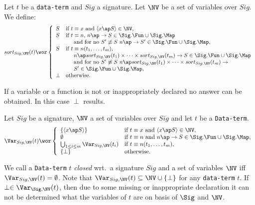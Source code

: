 \documentclass[twoside,fleqn,a4paper,dvips]{article}
\begin{document}
\begin{Dn}
Let $t$ be a {\tt data-term} and $Sig$ a signature. Let $\NV$ be a set
of variables over $Sig$. We define:
\[sort_{Sig,\NV}(t)\wor\left\{
\begin{array}{ll}
S&\mbox{if~}t\equiv x\mbox{ and }\langle x\ap S\rangle \in \NV,\\
S&\mbox{if $t\equiv n$, $n\ap \rightarrow S\in
\Sig.\Fun\cup\Sig.\Map$}\\
&\hspace*{0.5cm}\mbox{and for no $S'\not\equiv S$}~n\ap \rightarrow
S'\in\Sig.\Fun\cup\Sig.\Map,\\
S&\mbox{if $t\equiv n(t_1,\ldots,t_m)$,}\\
&\mbox{$\hspace{0.5cm}n\ap sort_{Sig,\NV}(t_1)\times \cdots
\times sort_{Sig,\NV}(t_m)\rightarrow S \in \Sig.\Fun\cup\Sig.\Map$}\\
&\hspace{0.5cm}\mbox{and for
no}~S'\not\equiv S~n\ap sort_{Sig,\NV}(t_1)\times \cdots
\times sort_{Sig,\NV}(t_m)\rightarrow\\
&\hspace*{0.5cm}S' \in \Sig.\Fun\cup\Sig.\Map,\\
\perp&\mbox{otherwise}.
\end{array}\right.\]
\end{Dn}
If a variable or a function is not or inappropriately declared 
no answer can be obtained. In this case $\perp$ results.
\begin{Dn}
Let $Sig$ be a signature, $\NV$ a set of
variables over $Sig$ and let $t$ be a {\tt Data-term}.
\[\Var_{Sig,\NV}(t)\wor
\left\{
\begin{array}{ll}
\{\langle x\ap S\rangle\}&\mbox{if }t\equiv x\mbox{ and }\langle
x\ap S\rangle\in \NV,\\
\emptyset&\mbox{if~}t\equiv n\mbox{ and }n\ap \rightarrow S\in
\Sig.\Fun\cup\Sig.\Map,\\
\bigcup_{1\leq i\leq m} \Var_{Sig,\NV}(t_i)&\mbox{if~}t\equiv 
n(t_1,\ldots,t_m),\\
\{\perp\}&\mbox{otherwise}.
\end{array}\right.\]
\end{Dn}
We call a {\tt Data-term} $t$ {\em closed} wrt.\ a signature
$Sig$ and a set of variables $\NV$ iff $\Var_{Sig,\NV}(t)=
\emptyset$. Note that $\Var_{Sig,\NV}(t)\subseteq\NV\cup\{\perp\}$
for any {\tt data-term} $t$. If $\perp\in \Var_{\Sig,\NV}(t)$, then
due  to some missing or inappropriate declaration 
it can not be determined what the variables of $t$ are on basis of
$\Sig$ and $\NV$.
\end{document}
